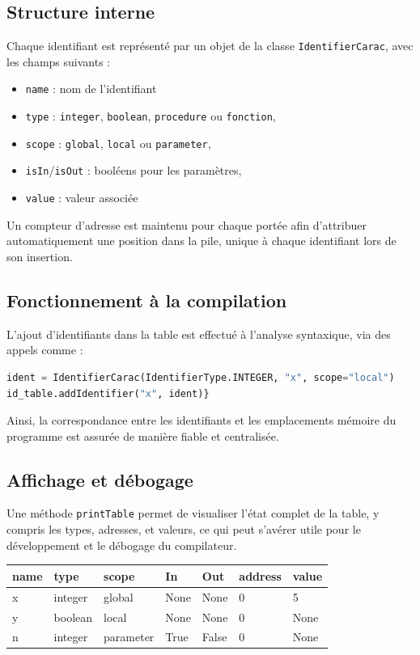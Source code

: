 \documentclass[a4paper, 12pt]{article}
\begin{document}
    \subsection{Structure interne}
    Chaque identifiant est représenté par un objet de la classe \texttt{IdentifierCarac}, avec les champs suivants : 
    \begin{itemize}
        \item \texttt{name} : nom de l'identifiant 
        \item \texttt{type} : \texttt{integer}, \texttt{boolean}, \texttt{procedure} ou \texttt{fonction},
        \item \texttt{scope} : \texttt{global}, \texttt{local} ou \texttt{parameter},
        \item \texttt{isIn}/\texttt{isOut} : booléens pour les paramètres,
        \item \texttt{value} : valeur associée 
    \end{itemize}

    Un compteur d'adresse est maintenu pour chaque portée afin d'attribuer automatiquement une position dans la pile, unique à chaque identifiant lors de son insertion. 

    \subsection{Fonctionnement à la compilation}

    L'ajout d'identifiants dans la table est effectué à l'analyse syntaxique, via des appels comme :
    \begin{lstlisting}[language=python, xleftmargin=20pt]
ident = IdentifierCarac(IdentifierType.INTEGER, "x", scope="local")
id_table.addIdentifier("x", ident)} \end{lstlisting}

    Ainsi, la correspondance entre les identifiants et les emplacements mémoire du programme est assurée de manière fiable et centralisée. 

    \subsection{Affichage et débogage}

    Une méthode \texttt{printTable} permet de visualiser l'état complet de la table, y compris les types, adresses, et valeurs, ce qui peut s'avérer utile pour le développement et le débogage du compilateur.

    \begin{center}
        \begin{tabular}{|l|l|l|l|l|l|l|}
            \hline
            \textbf{name} & \textbf{type} & \textbf{scope} & \textbf{In} & \textbf{Out} & \textbf{address} & \textbf{value} \\
            \hline
            x & integer & global & None & None & 0 & 5 \\
            y & boolean & local & None & None & 0 & None \\
            n & integer & parameter & True & False & 0 & None \\
            \hline
        \end{tabular}
    \end{center}
\end{document}
